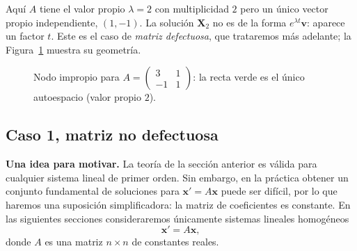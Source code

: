 \begin{note}
Aqu\'i $A$ tiene el valor propio $\lambda=2$ con multiplicidad $2$ pero un \'unico vector propio independiente, $(1,-1)$. La soluci\'on $\mathbf X_2$ no es de la forma $e^{\lambda t}\mathbf v$: aparece un factor $t$. Este es el caso de \emph{matriz defectuosa}, que trataremos m\'as adelante; la Figura~\ref{fig:nodo} muestra su geometr\'ia.
\end{note}

\begin{figure}[H]
\centering
{}
\caption{Nodo impropio para $A=\begin{pmatrix}3&1\\-1&1\end{pmatrix}$: la recta verde es el \'unico autoespacio (valor propio $2$).}
\label{fig:nodo}
\end{figure}

\subsection{Caso 1, matriz no defectuosa}

\textbf{Una idea para motivar.} La teor\'ia de la secci\'on anterior es v\'alida para cualquier sistema lineal de primer orden. Sin embargo, en la pr\'actica obtener un conjunto fundamental de soluciones para $\mathbf{x}' = A\mathbf{x}$ puede ser dif\'icil, por lo que haremos una suposici\'on simplificadora: la matriz de coeficientes es constante. En las siguientes secciones consideraremos \'unicamente sistemas lineales homog\'eneos
\[
\mathbf{x}' = A\mathbf{x},
\]
donde $A$ es una matriz $n \times n$ de constantes reales.

